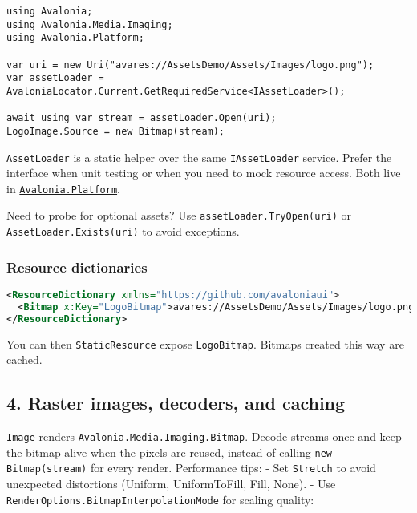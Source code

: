 \begin{lstlisting}
using Avalonia;
using Avalonia.Media.Imaging;
using Avalonia.Platform;

var uri = new Uri("avares://AssetsDemo/Assets/Images/logo.png");
var assetLoader = AvaloniaLocator.Current.GetRequiredService<IAssetLoader>();

await using var stream = assetLoader.Open(uri);
LogoImage.Source = new Bitmap(stream);
\end{lstlisting}

\passthrough{\lstinline!AssetLoader!} is a static helper over the same
\passthrough{\lstinline!IAssetLoader!} service. Prefer the interface
when unit testing or when you need to mock resource access. Both live in
\href{https://github.com/AvaloniaUI/Avalonia/blob/master/src/Avalonia.Base/Platform/AssetLoader.cs}{\passthrough{\lstinline!Avalonia.Platform!}}.

Need to probe for optional assets? Use
\passthrough{\lstinline!assetLoader.TryOpen(uri)!} or
\passthrough{\lstinline!AssetLoader.Exists(uri)!} to avoid exceptions.

\subsubsection{Resource dictionaries}\label{resource-dictionaries}

\begin{lstlisting}[language=XML]
<ResourceDictionary xmlns="https://github.com/avaloniaui">
  <Bitmap x:Key="LogoBitmap">avares://AssetsDemo/Assets/Images/logo.png</Bitmap>
</ResourceDictionary>
\end{lstlisting}

You can then \passthrough{\lstinline!StaticResource!} expose
\passthrough{\lstinline!LogoBitmap!}. Bitmaps created this way are
cached.

\subsection{4. Raster images, decoders, and
caching}\label{raster-images-decoders-and-caching}

\passthrough{\lstinline!Image!} renders
\passthrough{\lstinline!Avalonia.Media.Imaging.Bitmap!}. Decode streams
once and keep the bitmap alive when the pixels are reused, instead of
calling \passthrough{\lstinline!new Bitmap(stream)!} for every render.
Performance tips: - Set \passthrough{\lstinline!Stretch!} to avoid
unexpected distortions (Uniform, UniformToFill, Fill, None). - Use
\passthrough{\lstinline!RenderOptions.BitmapInterpolationMode!} for
scaling quality:

